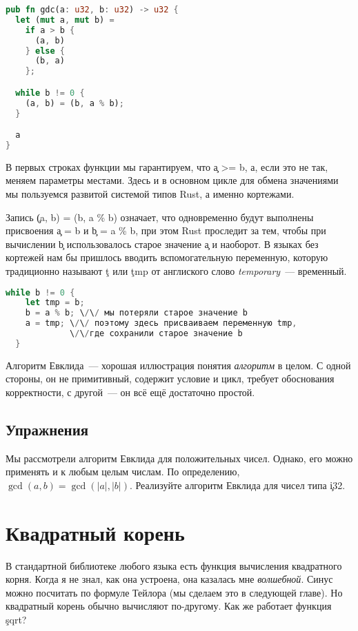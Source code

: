 \begin{lstlisting}[language=Rust]
pub fn gdc(a: u32, b: u32) -> u32 {
  let (mut a, mut b) =
    if a > b {
      (a, b)
    } else {
      (b, a)
    };

  while b != 0 {
    (a, b) = (b, a % b);
  }

  a
}
\end{lstlisting}

В первых строках функции мы гарантируем, что \c{a >= b}, а, если это не так, меняем параметры местами.
Здесь и в основном цикле для обмена значениями мы пользуемся развитой системой типов Rust, а именно кортежами.

Запись \c{(a, b) = (b, a \% b)} означает, что одновременно будут выполнены присвоения \c{a = b} и \c{b = a \% b}, при этом Rust проследит за тем, чтобы при вычислении \c{b} использовалось старое значение \c{a} и наоборот.
В языках без кортежей нам бы пришлось вводить вспомогательную переменную, которую традиционно называют \c{t} или \c{tmp} от англиского слово {\em temporary}~--- временный.

\begin{lstlisting}[language=Rust]
  while b != 0 {
    let tmp = b;
    b = a % b; \/\/ мы потеряли старое значение b
    a = tmp; \/\/ поэтому здесь присваиваем переменную tmp, 
             \/\/где сохранили старое значение b
  }
\end{lstlisting}

Алгоритм Евклида~--- хорошая иллюстрация понятия {\em алгоритм} в целом.
С одной стороны, он не примитивный, содержит условие и цикл, требует обоснования корректности, с другой~--- он всё ещё достаточно простой.

\subsection{Упражнения}

\begin{Exercise}
  \Question
  Мы рассмотрели алгоритм Евклида для положительных чисел.
  Однако, его можно применять и к любым целым числам.
  По определению, $\gcd(a, b) = \gcd(|a|, |b|)$.
  Реализуйте алгоритм Евклида для чисел типа \c{i32}.
\end{Exercise}

\section{Квадратный корень}

В стандартной библиотеке любого языка есть функция вычисления квадратного корня.
Когда я не знал, как она устроена, она казалась мне {\em волшебной}.
Синус можно посчитать по формуле Тейлора (мы сделаем это в следующей главе).
Но квадратный корень обычно вычисляют по-другому.
Как же работает функция \c{sqrt}?

